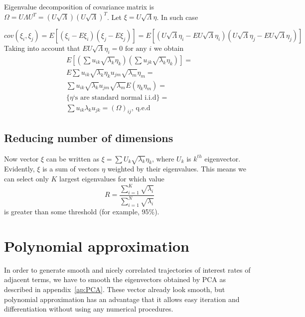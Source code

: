 \documentclass[11pt]{article} %
\newcommand{\euley}{U\sqrt{\Lambda}\eta}
\newcommand{\uley}[1]{\euley_#1}
\begin{document}
Eigenvalue decomposition of covariance matrix is $\Omega = U \Lambda U^T = \left(U\sqrt{\Lambda}\right) \left(U\sqrt{\Lambda}\right)^T$. Let $\xi =\euley$. In such case

\begin{equation}
cov(\xi_i,\xi_j) = 
E\left[(\xi_i-E\xi_i)(\xi_j-E\xi_j)\right] =
E\left[\left(\uley{i}-E\uley{i}\right)\left(\uley{j}-E\uley{j}\right)\right]  \nonumber 
\end{equation}
Taking into account that $E\uley{i} = 0 \text{ for any } i$ we obtain
\begin{multline}
E\left[\left(\sum{u_{ik}\sqrt{\lambda_k}\eta_k}\right)\left(\sum{u_{jk}\sqrt{\lambda_k}\eta_k}\right)\right] = \\
E\sum{u_{ik}\sqrt{\lambda_k}\eta_k u_{jm}\sqrt{\lambda_m}\eta_m} = \\
\sum{u_{ik}\sqrt{\lambda_k}u_{jm}\sqrt{\lambda_m}E(\eta_k\eta_m)} = \\
 \{\eta\text{`s are standard normal i.i.d}\} = \\
\sum{u_{ik}\lambda_ku_{jk}} = \left(\Omega\right)_{ij} \text{, q.e.d}
\end{multline}

\subsection{Reducing number of dimensions}
Now vector $\xi$ can be written as  $\xi = \sum{U_k\sqrt{\lambda_k}\eta_k}$, where $U_k$ is $k^{th}$ eigenvector. Evidently, $\xi$ is a sum of vectors $\eta$ weighted by their eigenvalues. This means we can select only $K$ largest eigenvalues for which value
\begin{equation}
R = \frac{\sum_{i=1}^K{\sqrt{\lambda_i}}}{\sum_{i=1}^N{\sqrt{\lambda_i}}}
\end{equation} 
is greater than some threshold (for example, 95\%).

\section{Polynomial approximation}
\label{ap:Polynom}

In order to generate smooth and nicely correlated trajectories of interest rates of adjacent terms, we have to smooth the eigenvectors obtained by PCA as described in appendix~\ref{ap:PCA}. These vector already look smooth, but polynomial approximation has an advantage that it allows easy iteration and differentiation without using any numerical procedures. 
\end{document}
